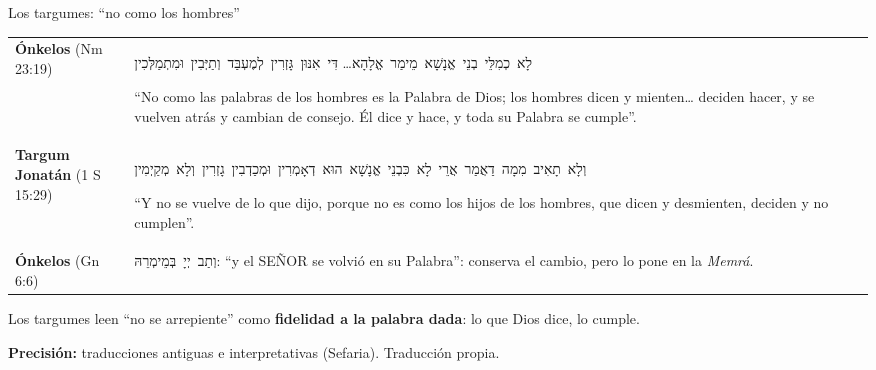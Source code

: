 \documentclass[hyperref={bookmarks=false},aspectratio=169]{beamer}
\newcommand{\heb}[1]{\mbox{\foreignlanguage{hebrew}{#1}}}
\newcommand{\SENOR}{S{\fontsize{0.78em}{1em}\selectfont EÑOR}}
\newcommand{\destacar}[1]{\textbf{\textcolor{azul}{#1}}}
\newcommand{\precision}[1]{{\footnotesize\color{gris}\textbf{Precisión:} #1}}
\begin{document}
\begin{frame}{Los targumes: ``no como los hombres''}
\scriptsize\renewcommand{\arraystretch}{1.2}
\begin{tabular}{@{}>{\RaggedRight\arraybackslash}p{2.4cm}>{\RaggedRight\arraybackslash}p{9.4cm}@{}}
\toprule
\textbf{Ónkelos} (Nm 23:19) & \heb{לָא כְמִלֵּי בְנֵי אֱנָשָׁא מֵימַר אֱלָהָא}\ldots{} \heb{דִּי אִנּוּן גָּזְרִין לְמֶעְבַּד וְתַיְּבִין וּמִתְמַלְּכִין}\par ``No como las palabras de los hombres es la Palabra de Dios; los hombres dicen y mienten\ldots{} deciden hacer, y se vuelven atrás y cambian de consejo. Él dice y hace, y toda su Palabra se cumple''. \\
\textbf{Targum Jonatán} (1 S 15:29) & \heb{וְלָא תָאִיב מִמָה דַאֲמַר אֲרֵי לָא כִּבְנֵי אֱנָשָׁא הוּא דְאָמְרִין וּמְכַדְבִין גָזְרִין וְלָא מְקַיְמִין}\par ``Y no se vuelve de lo que dijo, porque no es como los hijos de los hombres, que dicen y desmienten, deciden y no cumplen''. \\
\textbf{Ónkelos} (Gn 6:6) & \heb{וְתַב יְיָ בְּמֵימְרֵהּ}: ``y el \SENOR{} se volvió en su Palabra'': conserva el cambio, pero lo pone en la \emph{Memrá}. \\
\bottomrule
\end{tabular}\par\medskip
\small\RaggedRight Los targumes leen ``no se arrepiente'' como \destacar{fidelidad a la palabra dada}: lo que Dios dice, lo cumple.\par\smallskip
\precision{traducciones antiguas e interpretativas (Sefaria). Traducción propia.}
\end{frame}
\end{document}
